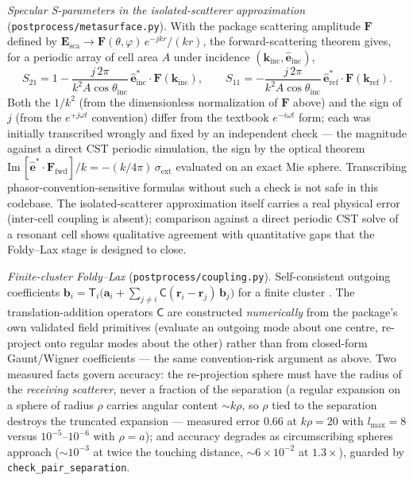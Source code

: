 \documentclass[11pt]{article}
\newcommand{\rr}{\mathbf{r}}
\newcommand{\kk}{\mathbf{k}}
\newcommand{\EE}{\mathbf{E}}
\newcommand{\ehat}{\hat{\mathbf{e}}}
\begin{document}
\emph{Specular S-parameters in the isolated-scatterer approximation}
(\texttt{postprocess/metasurface.py}).  With the package scattering
amplitude $\mathbf{F}$ defined by $\EE_{\mathrm{sca}} \to
\mathbf{F}(\theta,\varphi)\, e^{-jkr}/(kr)$, the forward-scattering
theorem gives, for a periodic array of cell area $A$ under incidence
$(\kk_{\mathrm{inc}}, \ehat_{\mathrm{inc}})$,
\begin{equation}
S_{21} = 1 - \frac{j\,2\pi}{k^{2}A\cos\theta_{\mathrm{inc}}}\,
 \ehat^{*}_{\mathrm{inc}}\cdot\mathbf{F}(\kk_{\mathrm{inc}}),
\qquad
S_{11} = -\frac{j\,2\pi}{k^{2}A\cos\theta_{\mathrm{inc}}}\,
 \ehat^{*}_{\mathrm{ref}}\cdot\mathbf{F}(\kk_{\mathrm{ref}}).
\label{eq:sparams}
\end{equation}
Both the $1/k^2$ (from the dimensionless normalization of $\mathbf{F}$
above) and the sign of $j$ (from the $e^{+j\omega t}$ convention) differ
from the textbook $e^{-i\omega t}$ form; each was initially transcribed
wrongly and fixed by an independent check --- the magnitude against a
direct CST periodic simulation, the sign by the optical theorem
$\mathrm{Im}\,[\ehat^*\!\cdot\mathbf{F}_{\mathrm{fwd}}]/k =
-(k/4\pi)\,\sigma_{\mathrm{ext}}$ evaluated on an exact Mie sphere.
Transcribing phasor-convention-sensitive formulas without such a check
is not safe in this codebase.  The isolated-scatterer approximation
itself carries a real physical error (inter-cell coupling is absent);
comparison against a direct periodic CST solve of a resonant cell shows
qualitative agreement with quantitative gaps that the Foldy--Lax stage
is designed to close.

\emph{Finite-cluster Foldy--Lax} (\texttt{postprocess/coupling.py}).
Self-consistent outgoing coefficients $\mathbf{b}_i =
\mathsf{T}_i\big(\mathbf{a}_i + \sum_{j\ne i}
\mathsf{C}(\rr_i - \rr_j)\,\mathbf{b}_j\big)$ for a finite cluster
\cite{Foldy1945,Tsang2001}.  The translation-addition operators
$\mathsf{C}$ are constructed \emph{numerically} from the package's own
validated field primitives (evaluate an outgoing mode about one centre,
re-project onto regular modes about the other) rather than from
closed-form Gaunt/Wigner coefficients --- the same
convention-risk argument as above.  Two measured facts govern accuracy:
the re-projection sphere must have the radius of the \emph{receiving
scatterer}, never a fraction of the separation (a regular expansion on
a sphere of radius $\rho$ carries angular content $\sim k\rho$, so
$\rho$ tied to the separation destroys the truncated expansion ---
measured error $0.66$ at $k\rho = 20$ with $l_{\max} = 8$ versus
$10^{-5}$--$10^{-6}$ with $\rho = a$); and accuracy degrades as
circumscribing spheres approach ($\sim$$10^{-3}$ at twice the touching
distance, $\sim$$6\times 10^{-2}$ at $1.3\times$), guarded by
\texttt{check\_pair\_separation}.
\end{document}
